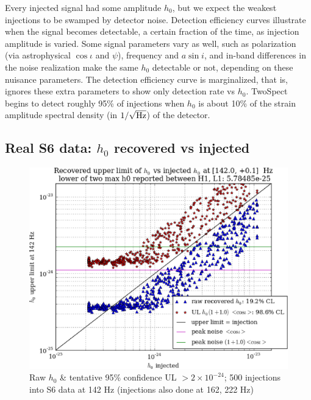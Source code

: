 Every injected signal had some amplitude $h_0$, but we expect the weakest injections to be swamped by detector noise.
Detection efficiency curves illustrate when the signal becomes detectable, a certain fraction of the time, as injection amplitude is varied.
Some signal parameters vary as well, such as polarization (via astrophysical $\cos \iota$ and $\psi$), frequency and $a \sin i$, and in-band differences in the noise realization make the same $h_0$ detectable or not, depending on these nuisance parameters.
The detection efficiency curve is marginalized, that is, ignores these extra parameters to show only detection rate vs $h_0$.
TwoSpect begins to detect roughly 95\% of injections when $h_0$ is about 10\% of the strain amplitude spectral density (in $1/\sqrt{\textup{Hz}}$) of the detector.

        \subsection{Real S6 data: $h_0$ recovered vs injected}

\begin{figure}
\begin{center}
\includegraphics[width=0.70\paperwidth,height=0.48\paperheight]{plots/h0UL-vs-h0injected-142-0Hz.eps}
\caption{
Raw $h_0$ \& tentative 95\% confidence UL $>2\times10^{-24}$; 500 injections
into S6 data at 142 Hz (injections also done at 162, 222 Hz)}
\label{S6_ULs_142}
\end{center}
\end{figure}

